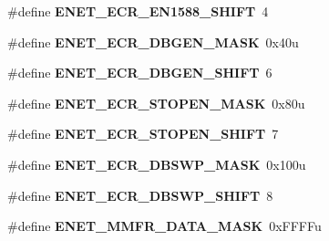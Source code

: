 \begin{DoxyCompactItemize}
\item 
\#define {\bfseries E\+N\+E\+T\+\_\+\+E\+C\+R\+\_\+\+E\+N1588\+\_\+\+S\+H\+I\+FT}~4\hypertarget{group__ENET__Register__Masks_ga35fdd6a1319857e1de70d68c4dd02685}{}\label{group__ENET__Register__Masks_ga35fdd6a1319857e1de70d68c4dd02685}

\item 
\#define {\bfseries E\+N\+E\+T\+\_\+\+E\+C\+R\+\_\+\+D\+B\+G\+E\+N\+\_\+\+M\+A\+SK}~0x40u\hypertarget{group__ENET__Register__Masks_ga0ac795d0ce9073caa7812af08d401bd2}{}\label{group__ENET__Register__Masks_ga0ac795d0ce9073caa7812af08d401bd2}

\item 
\#define {\bfseries E\+N\+E\+T\+\_\+\+E\+C\+R\+\_\+\+D\+B\+G\+E\+N\+\_\+\+S\+H\+I\+FT}~6\hypertarget{group__ENET__Register__Masks_gaf285ad3a1ec1a22c29463f3c5ce55629}{}\label{group__ENET__Register__Masks_gaf285ad3a1ec1a22c29463f3c5ce55629}

\item 
\#define {\bfseries E\+N\+E\+T\+\_\+\+E\+C\+R\+\_\+\+S\+T\+O\+P\+E\+N\+\_\+\+M\+A\+SK}~0x80u\hypertarget{group__ENET__Register__Masks_ga94a800b28e1ec6fbf2e6a237abe50dc6}{}\label{group__ENET__Register__Masks_ga94a800b28e1ec6fbf2e6a237abe50dc6}

\item 
\#define {\bfseries E\+N\+E\+T\+\_\+\+E\+C\+R\+\_\+\+S\+T\+O\+P\+E\+N\+\_\+\+S\+H\+I\+FT}~7\hypertarget{group__ENET__Register__Masks_ga265342bcbd0f282f5fbd894bb7e5191c}{}\label{group__ENET__Register__Masks_ga265342bcbd0f282f5fbd894bb7e5191c}

\item 
\#define {\bfseries E\+N\+E\+T\+\_\+\+E\+C\+R\+\_\+\+D\+B\+S\+W\+P\+\_\+\+M\+A\+SK}~0x100u\hypertarget{group__ENET__Register__Masks_ga1fccd5e705835e6e4232a4a73d66d151}{}\label{group__ENET__Register__Masks_ga1fccd5e705835e6e4232a4a73d66d151}

\item 
\#define {\bfseries E\+N\+E\+T\+\_\+\+E\+C\+R\+\_\+\+D\+B\+S\+W\+P\+\_\+\+S\+H\+I\+FT}~8\hypertarget{group__ENET__Register__Masks_ga62f057092940bf8385c24171c4414f76}{}\label{group__ENET__Register__Masks_ga62f057092940bf8385c24171c4414f76}

\item 
\#define {\bfseries E\+N\+E\+T\+\_\+\+M\+M\+F\+R\+\_\+\+D\+A\+T\+A\+\_\+\+M\+A\+SK}~0x\+F\+F\+F\+Fu\hypertarget{group__ENET__Register__Masks_ga9059e7e576983c3c51723ee135d4e244}{}\label{group__ENET__Register__Masks_ga9059e7e576983c3c51723ee135d4e244}


\end{DoxyCompactItemize}
